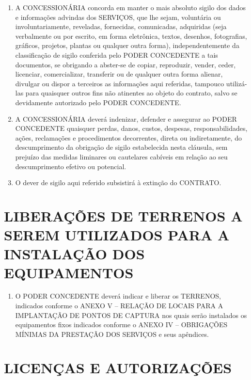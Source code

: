 \documentclass[a4paper,11pt]{report} %
\begin{document}
\begin{enumerate}
\item \label{itm:WB67} A CONCESSIONÁRIA concorda em manter o mais absoluto sigilo dos dados e informações advindas dos SERVIÇOS, que lhe sejam, voluntária ou involuntariamente, reveladas, fornecidas, comunicadas, adquiridas (seja verbalmente ou por escrito, em forma eletrônica, textos, desenhos, fotografias, gráficos, projetos, plantas ou qualquer outra forma), independentemente da classificação de sigilo conferida pelo PODER CONCEDENTE a tais documentos, se obrigando a abster-se de copiar, reproduzir, vender, ceder, licenciar, comercializar, transferir ou de qualquer outra forma alienar, divulgar ou dispor a terceiros as informações aqui referidas, tampouco utilizá-las para quaisquer outros fins não atinentes ao objeto do contrato, salvo se devidamente autorizado pelo PODER CONCEDENTE.  
\item \label{itm:SJRF} A CONCESSIONÁRIA deverá indenizar, defender e assegurar ao PODER CONCEDENTE quaisquer perdas, danos, custos, despesas, responsabilidades, ações, reclamações e procedimentos decorrentes, direta ou indiretamente, do descumprimento da obrigação de sigilo estabelecida nesta cláusula, sem prejuízo das medidas liminares ou cautelares cabíveis em relação ao seu descumprimento efetivo ou potencial.
\item \label{itm:4JAZ}  O dever de sigilo aqui referido subsistirá à extinção do CONTRATO.
\end{enumerate}

\section{LIBERAÇÕES DE TERRENOS A SEREM UTILIZADOS PARA A INSTALAÇÃO DOS EQUIPAMENTOS}
\label{sec:TXD9}

\begin{enumerate}
\item \label{itm:T8P9}	O PODER CONCEDENTE deverá indicar e liberar os TERRENOS, indicados conforme o ANEXO V – RELAÇÃO DE LOCAIS PARA A IMPLANTAÇÃO DE PONTOS DE CAPTURA nos quais serão instalados os equipamentos fixos indicados conforme o ANEXO IV – OBRIGAÇÕES MÍNIMAS DA PRESTAÇÃO DOS SERVIÇOS e seus apêndices.
\end{enumerate}

\section{LICENÇAS E AUTORIZAÇÕES}
\label{sec:F39J}
\end{document}
